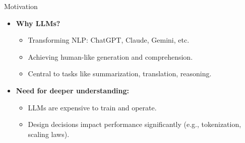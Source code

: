 \begin{frame}{Motivation}
  \begin{itemize}
    \item \textbf{Why LLMs?}
    \begin{itemize}
      \item Transforming NLP: ChatGPT, Claude, Gemini, etc.
      \item Achieving human-like generation and comprehension.
      \item Central to tasks like summarization, translation, reasoning.
    \end{itemize}
    \vspace{1em}
    \item \textbf{Need for deeper understanding:}
    \begin{itemize}
      \item LLMs are expensive to train and operate.
      \item Design decisions impact performance significantly (e.g., tokenization, scaling laws).
    \end{itemize}
  \end{itemize}
\end{frame}
